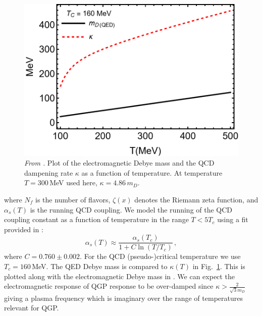\begin{figure}[ht]
    \centering
    \includegraphics[width=0.85\linewidth]{plots/chap02QCD/kappaDEBYE.png}
    \caption{\textit{From \cite{Grayson:2022asf}.} Plot of the electromagnetic Debye mass and the QCD dampening rate $\kappa$ as a function of temperature. At temperature $T=300\,$MeV used here, $\kappa = 4.86\, m_D$.\label{fig:kappaDebye}}
\end{figure}

where $N_f$ is the number of flavors, $\zeta(x)$ denotes the Riemann zeta function, and $\alpha_s(T)$ is the running QCD coupling.  We model the running of the QCD coupling constant as a function of temperature in the range $T<5T_c$ using a fit provided in \cite{Letessier:2002ony}:
\begin{equation}\label{eq:alphas}
    \alpha_s(T) \approx \frac{\alpha_s(T_c)}{1+C \ln(T/T_c)}\,,
\end{equation}
where $C=0.760 \pm 0.002$. For the QCD (pseudo-)critical temperature we use $T_c = 160\,$MeV. The QED Debye mass is compared to $\kappa(T)$ in Fig.~\ref{fig:kappaDebye}. 
This is plotted along with the electromagnetic Debye mass in . We can expect the electromagnetic response of QGP response to be over-damped since $\kappa> \frac{2}{\sqrt{3} m_D}$ giving a plasma frequency  which is imaginary over the range of temperatures relevant for QGP.


